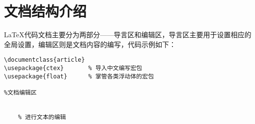 \part{文档结构介绍}
\LaTeX 代码文档主要分为两部分——导言区和编辑区，导言区主要用于设置相应的全局设置，编辑区则是文档内容的编写，代码示例如下：

\begin{lstlisting}[style = LaTeX_TeXworks]
% 导言区
\documentclass{article}
\usepackage{ctex}		% 导入中文编写宏包
\usepackage{float}		% 掌管各类浮动体的宏包

%文档编辑区

	
	% 进行文本的编辑
	

\end{lstlisting}

